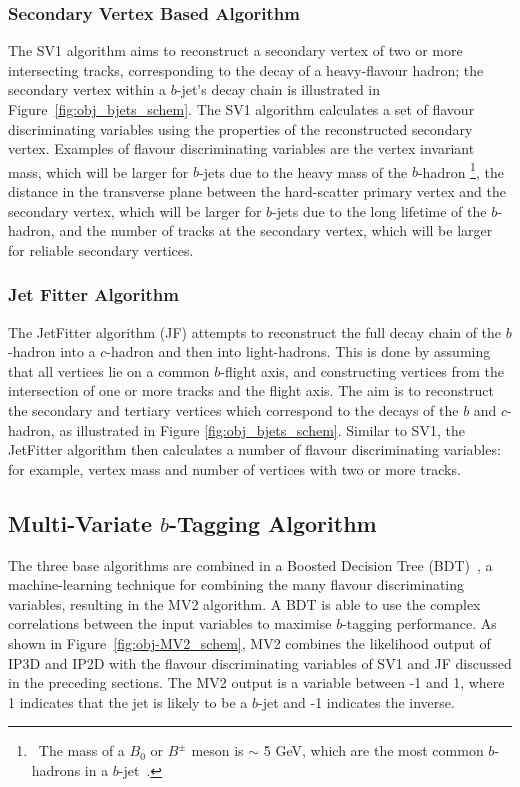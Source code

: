 \subsubsection{Secondary Vertex Based Algorithm}
\label{sec:obj-bjets_SV}

The SV1 algorithm aims to reconstruct a secondary vertex of two or more intersecting tracks, corresponding to the decay of a heavy-flavour hadron;
the secondary vertex within a $b$-jet's decay chain is illustrated in Figure~\ref{fig:obj_bjets_schem}.
The SV1 algorithm calculates a set of flavour discriminating variables using the properties of the reconstructed secondary vertex.
Examples of flavour discriminating variables are the vertex invariant mass,
which will be larger for $b$-jets due to the heavy mass of the $b$-hadron
\footnote{\ The mass of a $B_0$ or $B^\pm$ meson is $\sim$ 5 GeV, which are the most common $b$-hadrons in a $b$-jet~\cite{obj-bjets_PDG}.}, 
the distance in the transverse plane between the hard-scatter primary vertex and the secondary vertex, %
which will be larger for $b$-jets due to the long lifetime of the $b$-hadron,
and the number of tracks at the secondary vertex, which will be larger for reliable secondary vertices.

\subsubsection{Jet Fitter Algorithm}
\label{sec:obj-bjets_JF}

The JetFitter algorithm (JF) attempts to reconstruct the full decay chain of the $b$-hadron into a $c$-hadron and then into light-hadrons. 
This is done by assuming that all vertices lie on a common $b$-flight axis, and constructing vertices from the intersection of
one or more tracks and the flight axis.
The aim is to reconstruct the secondary and tertiary vertices which correspond to the decays of the $b$ and $c$-hadron,
as illustrated in Figure \ref{fig:obj_bjets_schem}.
Similar to SV1, the JetFitter algorithm then calculates a number of flavour discriminating variables:
for example, vertex mass and number of vertices with two or more tracks.

\subsection{Multi-Variate $b$-Tagging Algorithm}
\label{sec:obj-bjets_MV2}

The three base algorithms are combined in a Boosted Decision Tree (BDT)~\cite{obj-bjets_bdt},
a machine-learning technique for combining the many flavour discriminating variables, resulting in the MV2 algorithm.
A BDT is able to use the complex correlations between the input variables to maximise $b$-tagging performance.
As shown in Figure~\ref{fig:obj-MV2_schem}, MV2 combines the likelihood output of IP3D and IP2D
with the flavour discriminating variables of SV1 and JF discussed in the preceding sections.
The MV2 output is a variable between -1 and 1, where 1 indicates that the jet is likely to be a $b$-jet and -1 indicates the inverse.

